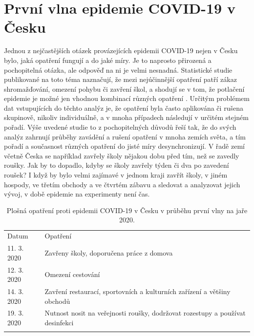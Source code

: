 \section*{První vlna epidemie COVID-19 v Česku}

Jednou z nejčastějších otázek provázejících epidemii COVID-19 nejen v Česku bylo, jaká opatření fungují a do jaké míry. Je to naprosto přirozená a pochopitelná otázka, ale odpověď na ni je velmi nesnadná. Statistické studie publikované na toto téma naznačují, že mezi nejúčinnější opatření patří zákaz shromažďování, omezení pohybu či zavření škol, a shodují se v tom, že potlačení epidemie je možné jen vhodnou kombinací různých opatření \cite{Flaxman_etal2020,Li_etal2020,Haug_etal2020,Liu_etal2021}. Určitým problémem dat vstupujících do těchto analýz je, že opatření byla často aplikována či rušena skupinově, nikoliv individuálně, a v mnoha případech následují v určitém stejném pořadí. Výše uvedené studie to z pochopitelných důvodů řeší tak, že do svých analýz zahrnují průběhy zavádění a rušení opatření v mnoha zemích světa, a tím pořadí a současnost různých opatření do jisté míry desynchronizují. V řadě zemí včetně Česka se například zavřely školy nějakou dobu před tím, než se zavedly roušky. Jak by to dopadlo, kdyby se školy zavřely týden či dva po zavedení roušek? I když by bylo velmi zajímavé v jednom kraji zavřít školy, v jiném hospody, ve třetím obchody a ve čtvrtém zábavu a sledovat a analyzovat jejich vývoj, v době epidemie na experimenty není čas.

\begin{table}[h]
	\begin{center}
	\begin{tabular}{lp{8cm}}
		\hline\noalign{\smallskip}
		Datum & Opatření \\
		\noalign{\smallskip}\hline\noalign{\smallskip}
		11. 3. 2020 & Zavřeny školy, doporučena práce z domova \\
		12. 3. 2020 & Omezení cestování \\
		14. 3. 2020 & Zavření restaurací, sportovních a kulturních zařízení a většiny obchodů \\ 
		19. 3. 2020 & Nutnost nosit na veřejnosti roušky, dodržovat rozestupy a používat desinfekci \\
		\noalign{\smallskip}\hline
	\end{tabular}
	\end{center}
	\caption{Plošná opatření proti epidemii COVID-19 v Česku v průběhu první vlny na jaře 2020.}
	\label{table:interventions}
\end{table}

